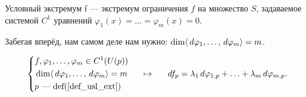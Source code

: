 \begin{to_def}
	Условный экстремум f --- экстремум ограничения $f$ на множество $S$, задаваемое системой $C^1$ уравнений $\varphi_1(x) = \ldots = \varphi_m(x) = 0$.

	Забегая вперёд, нам самом деле нам нужно: $\dim \langle \, d \varphi_1, \ldots, \, d \varphi_m\rangle = m$.
	\label{def_usl_ext}
\end{to_def}

\begin{to_thr}
	 \begin{equation*}
	 \left\{
	 	\begin{aligned}
	 		&f, \varphi_1,\ldots,\varphi_m \in C^1(U(p))\\
	 		&\dim \langle \, d \varphi_1, \ldots, \, d \varphi_m\rangle = m\\
	 		&p \text{ --- def(\ref{def_usl_ext})}
	 	\end{aligned}\right.
	 	\hspace*{0.5 cm} \mapsto \hspace*{0.5 cm}
	 	\, d f_p = \lambda_1 \, d \varphi_{1,p} + \ldots + \lambda_m \, d \varphi_{m,p}.
	 \end{equation*}
	 \label{thr_6.41}
\end{to_thr}
